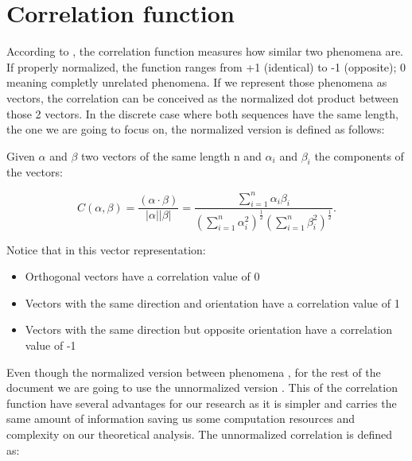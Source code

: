 
\section{Correlation function}

According to \citet{golomb_ref}, the correlation function measures how similar
two phenomena are. If properly normalized, the function ranges from
+1 (identical) to -1 (opposite); 0 meaning completly unrelated phenomena.
If we represent those phenomena as vectors, the correlation can be conceived
as the normalized dot product between those 2 vectors.
In the discrete case where both sequences have the same length, the one we are
going to focus on, the normalized version is defined as follows:

\begin{definition}\label{def:1}

Given $\alpha$ and $\beta$ two vectors of the same length n and $\alpha_{i}$
and $\beta_{i}$ the components of the vectors:

\begin{equation}\label{eq:1}
C(\alpha , \beta)=\frac{(\alpha \cdot  \beta)}{|\alpha||\beta|}=\frac{\sum_{i=1}^{n} \alpha_{i}\beta_{i}}{(\sum_{i=1}^{n} \alpha_{i}^{2})^{\frac{1}{2}}(\sum_{i=1}^{n} \beta_{i}^{2})^\frac{1}{2}}.
\end{equation}
\end{definition}

Notice that in this vector
representation:
\begin{itemize}
  \item Orthogonal vectors have a correlation value of 0 
  \item Vectors with the same direction and orientation have a correlation
  value of 1
  \item Vectors with the same direction but opposite orientation have a
  correlation value of -1
\end{itemize}

Even though the normalized version  between  phenomena , for the rest of the document we are going to use the
unnormalized version . This  of the correlation function
have several advantages for our research as it is simpler and carries the same
amount of information  saving us some computation resources and complexity on
our theoretical analysis. The unnormalized correlation is
defined as:

